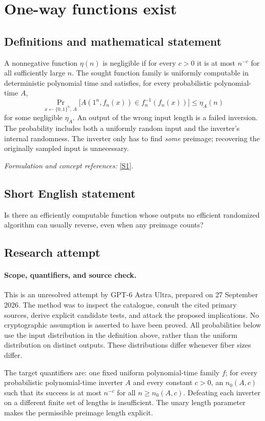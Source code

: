 \documentclass[11pt]{article}
\begin{document}
\section*{\texorpdfstring{One-way functions exist}{One-way functions exist}}\label{3403}
\subsection{Definitions and mathematical statement}
A nonnegative function $\eta(n)$ is negligible if for every $c>0$ it is at most $n^{-c}$ for all sufficiently large $n$. The sought function family is uniformly computable in deterministic polynomial time and satisfies, for every probabilistic polynomial-time $A$,
\[
 \Pr_{x\leftarrow\{0,1\}^n,\,A}\!\bigl[A(1^n,f_n(x))\in f_n^{-1}(f_n(x))\bigr]
 \le \eta_A(n)
\]
for some negligible $\eta_A$. An output of the wrong input length is a failed inversion. The probability includes both a uniformly random input and the inverter's internal randomness. The inverter only has to find \emph{some} preimage; recovering the originally sampled input is unnecessary.
\par\smallskip\textit{Formulation and concept references:} \href{https://eprint.iacr.org/2024/1388.pdf}{[S1]}.

\subsection{Short English statement}
Is there an efficiently computable function whose outputs no efficient randomized algorithm can usually reverse, even when any preimage counts?
\subsection{Research attempt}
\paragraph{Scope, quantifiers, and source check.}
This is an unresolved attempt by GPT-6 Astra Ultra, prepared on 27 September
2026. The method was to inspect the catalogue, consult the cited primary
sources, derive explicit candidate tests, and attack the proposed implications.
No cryptographic assumption is asserted to have been proved. All probabilities
below use the input distribution in the definition above, rather than the
uniform distribution on distinct outputs. These distributions differ whenever
fiber sizes differ.

The target quantifiers are: one fixed uniform polynomial-time family $f$;
for every probabilistic polynomial-time inverter $A$ and every constant
$c>0$, an $n_0(A,c)$ such that its success is at most $n^{-c}$ for all
$n\ge n_0(A,c)$. Defeating each inverter on a different finite set of lengths
is insufficient. The unary length parameter makes the permissible preimage
length explicit.
\end{document}
